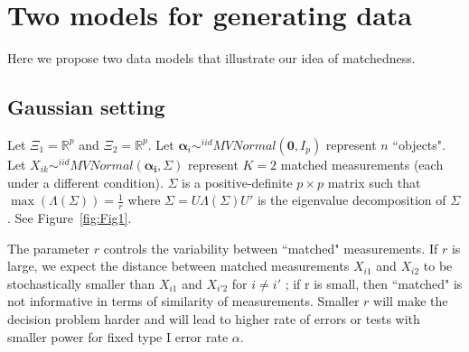 \documentclass[11pt]{article} %
\begin{document}
\section{Two  models for generating data}
Here we propose two data models that illustrate our idea of matchedness.
\subsection{Gaussian setting\label{subsec:GaussianSet}}
	Let    $\Xi_1 = \mathbb{R}^{p}$ and $\Xi_2 = \mathbb{R}^{p}$.
  Let $\bm{\alpha}_i \sim^{iid} MVNormal(\bm{0},I_p)$ represent $n$ ``objects".  Let $X_{ik} \sim^{iid} MVNormal(\bm{\alpha_i},\Sigma)$ represent $K=2$ matched measurements (each under a different condition).
  $\Sigma$ is a positive-definite $p\times p$ matrix such that  $\max(\Lambda(\Sigma))=\frac{1}{r} $ where $\Sigma=U\Lambda(\Sigma)U'$  is the eigenvalue decomposition of $\Sigma$. See Figure~\ref{fig:Fig1}.

The parameter $r$ controls the variability between ``matched" measurements. If $r$ is large, we expect the distance between matched measurements
$X_{i1}$ and $X_{i2}$ to be stochastically smaller than $X_{i1}$ and $X_{i'2}$ for $i \neq i'$ ; if r is small, then ``matched" is not informative in terms of similarity of measurements.
 Smaller $r$ will make the decision problem harder and will lead to higher rate of errors or tests with smaller power for fixed type I error rate $\alpha$.
  
\end{document}
